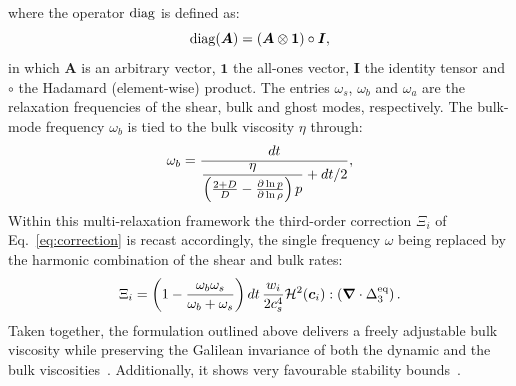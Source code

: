 where the operator ${\rm diag}$ is defined as:
\begin{equation}
    {\rm diag}(\bm{A}) = (\bm{A}\otimes\bm{1})\circ \bm{I},
\end{equation}
in which $\bm{A}$ is an arbitrary vector, $\bm{1}$ the all-ones vector, $\bm{I}$ the identity tensor and $\circ$ the Hadamard (element-wise) product. The entries $\omega_s$, $\omega_b$ and $\omega_a$ are the relaxation frequencies of the shear, bulk and ghost modes, respectively. The bulk-mode frequency $\omega_b$ is tied to the bulk viscosity $\eta$ through:
\begin{equation}
    \omega_b = \frac{dt}{\deleted{(\frac{2+D}{D}-\frac{\partial\ln p}{\partial\ln \rho})\frac{\eta}{p}}\added{\dfrac{\eta}{\left(\frac{2+D}{D}-\frac{\partial\ln p}{\partial\ln \rho}\right)p}} + dt/2}\added{,}
\end{equation}
Within this multi-relaxation framework the third-order correction $\Xi_i$ of Eq.~\ref{eq:correction} is recast accordingly, the single frequency $\omega$ being replaced by the harmonic combination of the shear and bulk rates:
\begin{equation}\label{eq:correction_MRT}
    \Xi_i = \left(1-\frac{\omega_b\omega_s}{\omega_b+\omega_s}\right)\added{dt\,}\frac{w_i}{2c_s^4}\deleted{\left(\bm{\nabla}\mathcal{H}_2\right):\Delta^{\rm eq}_3}\added{\mathcal{H}^2(\bm{c}_i):\left(\bm{\nabla}\cdot\Delta^{\rm eq}_3\right)}.
\end{equation}
Taken together, the formulation outlined above delivers a freely adjustable bulk viscosity while preserving the Galilean invariance of both the dynamic and the bulk viscosities~\cite{hosseini2022lattice,hosseini2020compressibility}. Additionally, it shows very favourable stability bounds~\cite{hosseini2022lattice,neeraj2023}.


